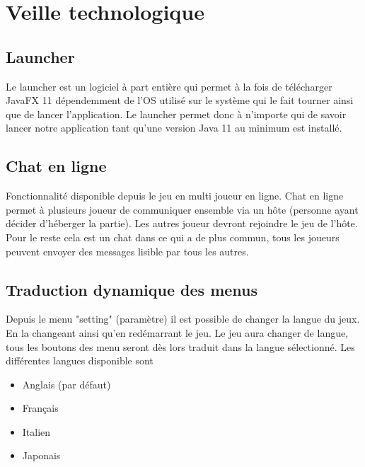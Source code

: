 \newpage
\section{Veille technologique}
\subsection{Launcher}
Le launcher est un logiciel à part entière qui permet à la fois de télécharger JavaFX 11 dépendemment de l'OS utilisé sur le système qui le fait tourner ainsi que de lancer l'application. Le launcher permet donc à n'importe qui de savoir lancer 
notre application tant qu'une version Java 11 au minimum est installé.  
\subsection{Chat en ligne}
Fonctionnalité disponible depuis le jeu en multi joueur en ligne. Chat en ligne permet à plusieurs joueur de communiquer ensemble via un hôte (personne ayant décider d'héberger la partie). Les autres joueur devront rejoindre le jeu de l'hôte. 
Pour le reste cela est un chat dans ce qui a de plus commun, tous les joueurs peuvent envoyer des messages lisible par tous les autres. 
\subsection{Traduction dynamique des menus}
Depuis le menu "setting" (paramètre) il est possible de changer la langue du jeux. En la changeant ainsi qu'en redémarrant le jeu. Le jeu aura changer de langue, tous les boutons des menu seront dès lors traduit dans la langue sélectionné.
Les différentes langues disponible sont 
\begin{itemize}
	\item Anglais (par défaut)
	\item Français
	\item Italien
	\item Japonais
\end{itemize} 
